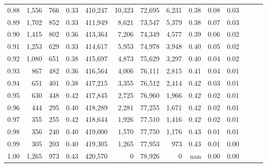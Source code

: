 \begin{tabular}{rrrrrrrrrrrrrr}
0.88 &   1,556 &    766 &  0.33 &  410,247 &   10,323 &  72,695 &   6,231 &  0.38 &  0.08 &      0.03 \\
0.89 &   1,702 &    852 &  0.33 &  411,949 &    8,621 &  73,547 &   5,379 &  0.38 &  0.07 &      0.03 \\
0.90 &   1,415 &    802 &  0.36 &  413,364 &    7,206 &  74,349 &   4,577 &  0.39 &  0.06 &      0.02 \\
0.91 &   1,253 &    629 &  0.33 &  414,617 &    5,953 &  74,978 &   3,948 &  0.40 &  0.05 &      0.02 \\
0.92 &   1,080 &    651 &  0.38 &  415,697 &    4,873 &  75,629 &   3,297 &  0.40 &  0.04 &      0.02 \\
0.93 &     867 &    482 &  0.36 &  416,564 &    4,006 &  76,111 &   2,815 &  0.41 &  0.04 &      0.01 \\
0.94 &     651 &    401 &  0.38 &  417,215 &    3,355 &  76,512 &   2,414 &  0.42 &  0.03 &      0.01 \\
0.95 &     630 &    448 &  0.42 &  417,845 &    2,725 &  76,960 &   1,966 &  0.42 &  0.02 &      0.01 \\
0.96 &     444 &    295 &  0.40 &  418,289 &    2,281 &  77,255 &   1,671 &  0.42 &  0.02 &      0.01 \\
0.97 &     355 &    255 &  0.42 &  418,644 &    1,926 &  77,510 &   1,416 &  0.42 &  0.02 &      0.01 \\
0.98 &     356 &    240 &  0.40 &  419,000 &    1,570 &  77,750 &   1,176 &  0.43 &  0.01 &      0.01 \\
0.99 &     305 &    203 &  0.40 &  419,305 &    1,265 &  77,953 &     973 &  0.43 &  0.01 &      0.00 \\
1.00 &   1,265 &    973 &  0.43 &  420,570 &        0 &  78,926 &       0 &   nan &  0.00 &      0.00 \\
\bottomrule
\end{tabular}
